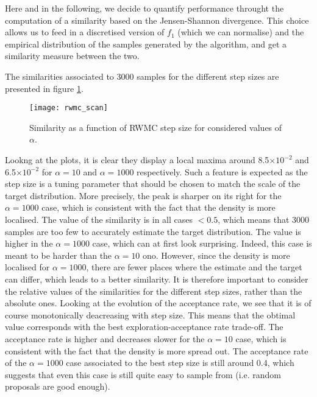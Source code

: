 \documentclass[a4paper, 12pt,oneside]{article}
\begin{document}
			Here and in the following, we decide to quantify performance throught the computation of a similarity based on the Jensen-Shannon divergence. This choice allows us to feed in a discretised version of $f_1$ (which we can normalise) and the empirical distribution of the samples generated by the algorithm, and get a similarity measure between the two.

			The similarities associated to 3000 samples for the different step sizes are presented in figure \ref{fig:rwmc-scan}.
			\begin{figure}[htb]
				\centering
					\vspace{0em}
					\texttt{[image: rwmc\_scan]}
					\caption{Similarity as a function of RWMC step size for considered values of $\alpha$.}
					\label{fig:rwmc-scan}
			\end{figure}
			Lookng at the plots, it is clear they display a local maxima around 8.5$\times 10^{-2}$ and 6.5$\times 10^{-2}$ for $\alpha=10$ and $\alpha=1000$ respectively. Such a feature is expected as the step size is a tuning parameter that should be chosen to match the scale of the target distribution.
			More precisely, the peak is sharper on its right for the $\alpha=1000$ case, which is consistent with the fact that the density is more localised. 
			The value of the similarity is in all cases $<0.5$, which means that 3000 samples are too few to accurately estimate the target distribution. The value is higher in the $\alpha=1000$ case, which can at first look surprising. Indeed, this case is meant to be harder than the $\alpha=10$ ono. However, since the density is more localised for $\alpha=1000$, there are fewer places where the estimate and the target can differ, which leads to a better similarity. It is therefore important to consider the relative values of the similarities for the different step sizes, rather than the absolute ones.
			Looking at the evolution of the acceptance rate, we see that it is of course monotonically deacreasing with step size. This means that the obtimal value corresponds with the best exploration-acceptance rate trade-off. The acceptance rate is higher and decreases slower for the $\alpha=10$ case, which is consistent with the fact that the density is more spread out. The acceptance rate of the $\alpha=1000$ case associated to the best step size is still around 0.4, which suggests that even this case is still quite easy to sample from (i.e. random proposals are good enough). 
\end{document}
